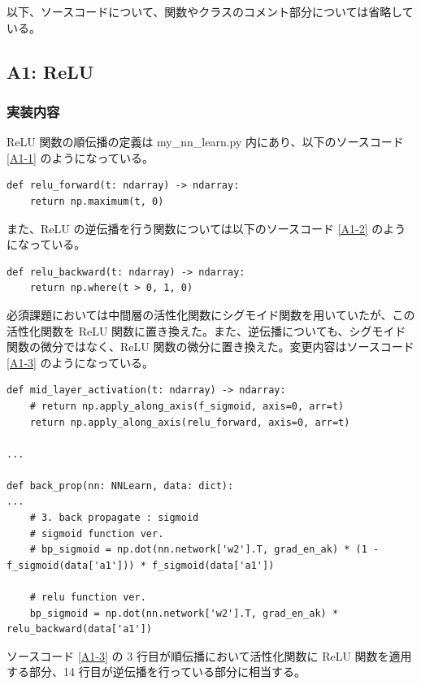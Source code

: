 \documentclass[a4paper,dvipdfmx]{jsarticle}
\begin{document}
以下、ソースコードについて、関数やクラスのコメント部分については省略している。

\subsection*{A1: ReLU}

\subsubsection*{実装内容}

ReLU 関数の順伝播の定義は my\_nn\_learn.py 内にあり、以下のソースコード \ref{A1-1} のようになっている。

\begin{lstlisting}[caption="ReLU 関数(順伝播)",label=A1-1]
def relu_forward(t: ndarray) -> ndarray:
    return np.maximum(t, 0)
\end{lstlisting}

また、ReLU の逆伝播を行う関数については以下のソースコード \ref{A1-2} のようになっている。

\begin{lstlisting}[caption="ReLU 関数(逆伝播)",label=A1-2]
def relu_backward(t: ndarray) -> ndarray:
    return np.where(t > 0, 1, 0)
\end{lstlisting}

必須課題においては中間層の活性化関数にシグモイド関数を用いていたが、この活性化関数を ReLU 関数に置き換えた。また、逆伝播についても、シグモイド関数の微分ではなく、ReLU 関数の微分に置き換えた。変更内容はソースコード \ref{A1-3} のようになっている。

\begin{lstlisting}[caption="中間層の変更内容",label=A1-3]
def mid_layer_activation(t: ndarray) -> ndarray:
    # return np.apply_along_axis(f_sigmoid, axis=0, arr=t)
    return np.apply_along_axis(relu_forward, axis=0, arr=t)
    
...

def back_prop(nn: NNLearn, data: dict):
...
    # 3. back propagate : sigmoid
    # sigmoid function ver.
    # bp_sigmoid = np.dot(nn.network['w2'].T, grad_en_ak) * (1 - f_sigmoid(data['a1'])) * f_sigmoid(data['a1'])

    # relu function ver.
    bp_sigmoid = np.dot(nn.network['w2'].T, grad_en_ak) * relu_backward(data['a1'])
\end{lstlisting}

ソースコード \ref{A1-3} の 3 行目が順伝播において活性化関数に ReLU 関数を適用する部分、14 行目が逆伝播を行っている部分に相当する。
\end{document}
